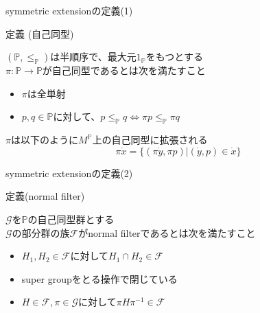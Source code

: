 \documentclass[17pt,aspectratio=169]{beamer}
\newcommand{\Pbb}{\mathbb{P}}
\newcommand{\Gcal}{\mathcal{G}}
\newcommand{\Fcal}{\mathcal{F}}
\begin{document}
\begin{frame}{symmetric extensionの定義(1)}
    \begin{itembox}[l]{定義 (自己同型)}
        {\small
            $(\Pbb, \le_{\Pbb})$は半順序で、最大元$1_{\Pbb}$をもつとする \\
            $\pi : \Pbb \rightarrow \Pbb$が自己同型であるとは次を満たすこと
            \begin{itemize}
                \setlength{\itemsep}{3pt}
                \item $\pi$は全単射
                \item $p, q \in \Pbb$に対して、$p \le_{\Pbb} q \Leftrightarrow \pi p \le_{\Pbb} \pi q$
            \end{itemize}
            $\pi$は以下のように$M^\Pbb$上の自己同型に拡張される
            $$ \pi \dot{x} = \{ (\pi \dot{y}, \pi p) | (\dot{y}, p) \in \dot{x} \} $$
        }
    \end{itembox}
\end{frame}


\begin{frame}{symmetric extensionの定義(2)}
    \begin{itembox}[l]{定義(normal filter)}
        {\small
            $\Gcal$を$\Pbb$の自己同型群とする \\
            $\Gcal$の部分群の族$\Fcal$がnormal filterであるとは次を満たすこと
            \begin{itemize}
                \setlength{\itemsep}{3pt}
                \item $H_1, H_2 \in \Fcal$に対して$H_1 \cap H_2 \in \Fcal$
                \item super groupをとる操作で閉じている
                \item $H \in \Fcal, \pi \in \Gcal$に対して$\pi H \pi^{-1} \in \Fcal$
            \end{itemize} }
    \end{itembox}
\end{frame}
\end{document}
